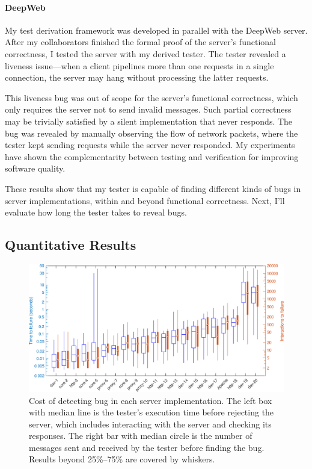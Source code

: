 \paragraph{DeepWeb}
My test derivation framework was developed in parallel with the DeepWeb server.
After my collaborators finished the formal proof of the server's functional
correctness, I tested the server with my derived tester.  The tester
revealed a liveness issue---when a client pipelines more than one requests in a
single connection, the server may hang without processing the latter requests.

This liveness bug was out of scope for the server's functional correctness,
which only requires the server not to send invalid messages.  Such partial
correctness may be trivially satisfied by a silent implementation that never
responds.  The bug was revealed by manually observing the flow of network
packets, where the tester kept sending requests while the server never
responded.  My experiments have shown the complementarity between testing and
verification for improving software quality.

These results show that my tester is capable of finding different kinds of bugs
in server implementations, within and beyond functional correctness.  Next, I'll
evaluate how long the tester takes to reveal bugs.

\subsection{Quantitative Results}
\label{sec:http-quant}

\begin{figure}
  \includegraphics[width=\textwidth]{figures/http-time}
  \caption[Cost of detecting bug in each server/mutant.]{Cost of detecting bug
    in each server implementation.  The left box with median line is the
    tester's execution time before rejecting the server, which includes
    interacting with the server and checking its responses.  The right bar with
    median circle is the number of \http messages sent and received by the
    tester before finding the bug.  Results beyond 25\%--75\% are covered by
    whiskers.
  }
  \label{fig:checker-performance}
\end{figure}

